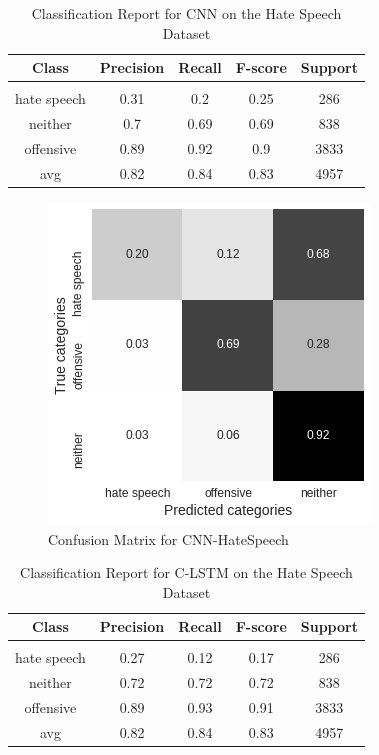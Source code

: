 \documentclass[11pt, oneside]{article}   	%
\begin{document}
\newpage
\begin{table}[h]
\centering
\caption{Classification Report for CNN on the Hate Speech Dataset}
\begin{tabular}{c | c c c c}
Class & Precision & Recall & F-score & Support\\
\hline
\hline\\
hate speech & 0.31 & 0.2 & 0.25 & 286\\
neither & 0.7 & 0.69 & 0.69 & 838\\
offensive & 0.89 & 0.92 & 0.9 & 3833\\
avg & 0.82 & 0.84 & 0.83 & 4957\\
\end{tabular}
\end{table}

\begin{figure}[h]
\centering
\includegraphics[width=0.6\linewidth]{CNN-HateSpeech}
\caption{Confusion Matrix for CNN-HateSpeech}
\label{fig:CNN-HateSpeech}
\end{figure}


\newpage
\begin{table}[h]
\centering
\caption{Classification Report for C-LSTM on the Hate Speech Dataset}
\begin{tabular}{c | c c c c}
Class & Precision & Recall & F-score & Support\\
\hline
\hline\\
hate speech & 0.27 & 0.12 & 0.17 & 286\\
neither & 0.72 & 0.72 & 0.72 & 838\\
offensive & 0.89 & 0.93 & 0.91 & 3833\\
avg & 0.82 & 0.84 & 0.83 & 4957\\
\end{tabular}
\end{table}
\end{document}
